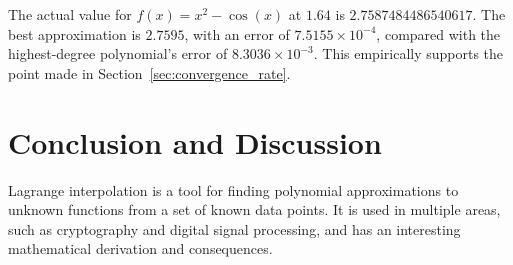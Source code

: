 \documentclass[12pt]{article}
\theoremstyle{plain}
\theoremstyle{remark}
\begin{document}
The actual value for $f(x) = x^2 - \cos(x)$ at $1.64$ is $2.7587484486540617$. The best approximation is $2.7595$, with an error of $7.5155 \times 10^{-4}$, compared with the highest-degree polynomial's error of $8.3036 \times 10^{-3}$. This empirically supports the point made in Section~\ref{sec:convergence_rate}.

\section{Conclusion and Discussion}\label{sec:conclusion}

Lagrange interpolation is a tool for finding polynomial approximations to unknown functions from a set of known data points. It is used in multiple areas, such as cryptography and digital signal processing, and has an interesting mathematical derivation and consequences.



\end{document}
